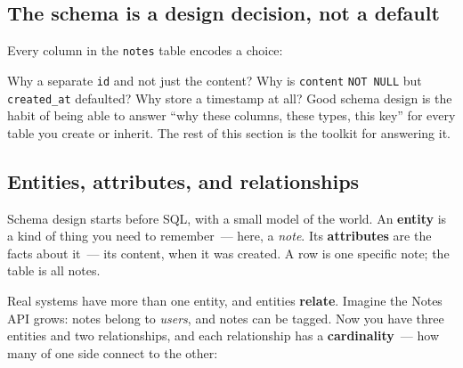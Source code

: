 \subsection*{The schema is a design decision, not a default}\label{06-local-dependencies:the-schema-is-a-design-decision-not-a-default}

Every column in the \texttt{notes} table encodes a choice:

\begin{codebox}[short]

\begin{Shaded}
\begin{Highlighting}[]
 
               
 \NormalTok{,                       }
    
\NormalTok{);}
\end{Highlighting}
\end{Shaded}

\end{codebox}

\noindent{}Why a separate \texttt{id} and not just the content? Why is \texttt{content} \texttt{NOT\ NULL} but \texttt{created\_at} defaulted? Why store a timestamp at all? Good schema design is the habit of being able to answer ``why these columns, these types, this key'' for every table you create or inherit. The rest of this section is the toolkit for answering it.

\subsection*{Entities, attributes, and relationships}\label{06-local-dependencies:entities-attributes-and-relationships}

Schema design starts before SQL, with a small model of the world. An \textbf{entity} is a kind of thing you need to remember~--- here, a \emph{note}. Its \textbf{attributes} are the facts about it~--- its content, when it was created. A row is one specific note; the table is all notes.

Real systems have more than one entity, and entities \textbf{relate}. Imagine the Notes API grows: notes belong to \emph{users}, and notes can be tagged. Now you have three entities and two relationships, and each relationship has a \textbf{cardinality}~--- how many of one side connect to the other:

